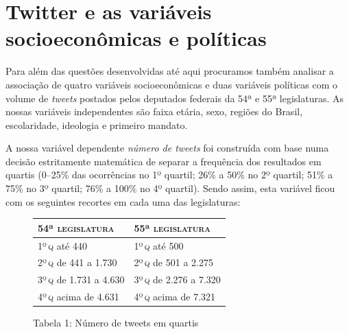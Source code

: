 
\section{Twitter e as variáveis socioeconômicas e políticas}

Para além das questões desenvolvidas até aqui procuramos também analisar
a associação de quatro variáveis socioeconômicas e duas variáveis
políticas com o volume de \textit{tweets} postados pelos deputados
federais da 54ª e 55ª legislaturas. As nossas variáveis independentes
são faixa etária, sexo, regiões do Brasil, escolaridade, ideologia e
primeiro mandato.

A nossa variável dependente \textit{número de tweets} foi
construída com base numa decisão estritamente matemática de separar a
frequência dos resultados em quartis (0--25\% das ocorrências no 1º
quartil; 26\% a 50\% no 2º quartil; 51\% a 75\% no 3º quartil; 76\% a
100\% no 4º quartil). Sendo assim, esta variável ficou com os seguintes
recortes em cada uma das legislaturas:

\begin{figure}[!ht]
\begin{center}
\begin{tabular}{|l|l|}
\hline
\textsc{54ª legislatura} & \textsc{55ª legislatura} \\ \hline\hline
1º\,\textsc{q} até 440 & 1º\,\textsc{q} até 500 \\ \hline
2º\,\textsc{q} de 441 a 1.730 & 2º\,\textsc{q} de 501 a 2.275 \\ \hline
3º\,\textsc{q} de 1.731 a 4.630 & 3º\,\textsc{q} de 2.276 a 7.320 \\ \hline
4º\,\textsc{q} acima de 4.631 & 4º\,\textsc{q} acima de 7.321 \\ \hline
\end{tabular}
\end{center}

\caption{Tabela 1: Número de tweets em quartis\footnotemark}
\end{figure}


